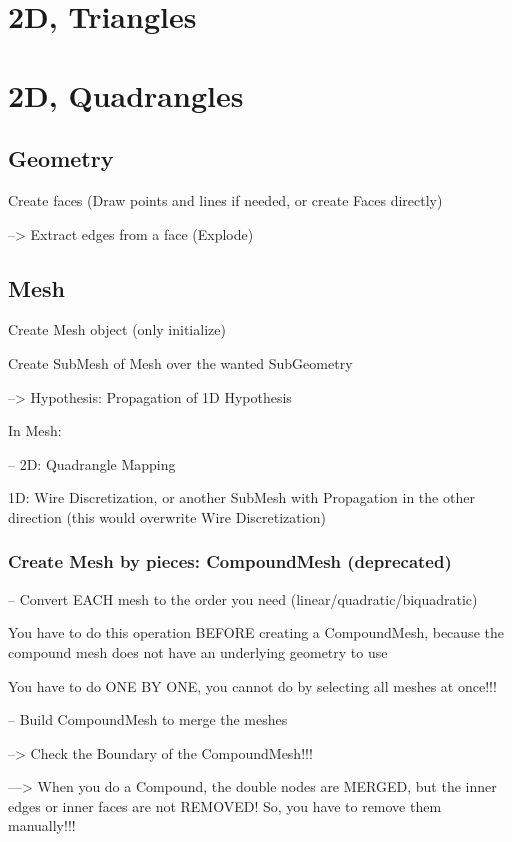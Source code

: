 \documentclass[10pt]{book}
\begin{document}
 \section{2D, Triangles}
 
  
 
 \section{2D, Quadrangles}


\subsection{Geometry}


Create faces (Draw points and lines if needed, or create Faces directly)

   --> Extract edges from a face (Explode)
   
\subsection{Mesh}
 
Create Mesh object (only initialize)

Create SubMesh of Mesh over the wanted SubGeometry

   --> Hypothesis: Propagation of 1D Hypothesis

In Mesh:

--   2D: Quadrangle Mapping

   1D: Wire Discretization, or another SubMesh with Propagation in the other direction (this would overwrite Wire Discretization)

  
  \subsubsection{Create Mesh by pieces: CompoundMesh (deprecated)}
  
-- Convert EACH mesh to the order you need (linear/quadratic/biquadratic)

  You have to do this operation BEFORE creating a CompoundMesh,
  because the compound mesh does not have an underlying geometry to use 
   
  You have to do ONE BY ONE, you cannot do by selecting all meshes at once!!! 

  
-- Build CompoundMesh to merge the meshes

     --> Check the Boundary of the CompoundMesh!!! 
     
     ---> When you do a Compound, the double nodes are MERGED, but the inner edges or inner faces are not REMOVED! So, you have to remove them manually!!!
     
\end{document}

